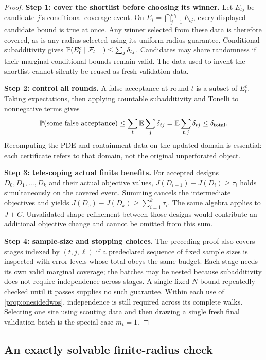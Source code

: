 \begin{proof}
\textbf{Step 1: cover the shortlist before choosing its winner.}
Let $E_{tj}$ be candidate $j$'s conditional coverage event. On
$E_t=\bigcap_{j=1}^{m_t}E_{tj}$, every displayed candidate bound is true
at once. Any winner selected from these data is therefore covered, as is
any radius selected using its uniform radius guarantee. Conditional
subadditivity gives
$\mathbb{P}(E_t^c\mid\mathcal F_{t-1})\le\sum_j\delta_{tj}$.
Candidates may share randomness if their marginal conditional bounds remain
valid. The data used to invent the shortlist cannot silently be reused as
fresh validation data.

\textbf{Step 2: control all rounds.}
A false acceptance at round $t$ is a subset of $E_t^c$. Taking expectations,
then applying countable subadditivity and Tonelli to nonnegative terms gives
\[
 \mathbb{P}(\text{some false acceptance})
 \le\sum_t\mathbb{E}\sum_j\delta_{tj}
 =\mathbb{E}\sum_{t,j}\delta_{tj}\le\delta_{\rm total}.
\]
Recomputing the PDE and containment data on the updated domain is essential:
each certificate refers to that domain, not the original unperforated object.

\textbf{Step 3: telescoping actual finite benefits.}
For accepted designs $D_0,D_1,\ldots,D_k$ and their actual objective values,
$J(D_{i-1})-J(D_i)\ge\tau_i$ holds simultaneously on the covered event.
Summing cancels the intermediate objectives and yields
$J(D_0)-J(D_k)\ge\sum_{i=1}^k\tau_i$. The same algebra applies to $J+C$.
Unvalidated shape refinement between those designs would contribute an
additional objective change and cannot be omitted from this sum.

\textbf{Step 4: sample-size and stopping choices.}
The preceding proof also covers stages indexed by $(t,j,\ell)$ if a
predeclared sequence of fixed sample sizes is inspected with error levels
whose total obeys the same budget. Each stage needs its own valid marginal
coverage; the batches may be nested because subadditivity does not require
independence across stages. A single fixed-$N$ bound repeatedly checked
until it passes supplies no such guarantee. Within each use of
\cref{prop:onesidedwos}, independence is still required across its complete
walks. Selecting one site using scouting data and then drawing a single
fresh final validation batch is the special case $m_t=1$.
\end{proof}

\subsection{An exactly solvable finite-radius check}
\label{app:benefitcheck}


